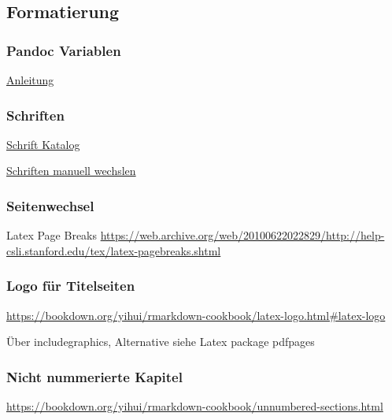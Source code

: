 \documentclass[
  a4paper,
  twoside]{article}
\begin{document}
\newpage

\hypertarget{formatierung}{%
\subsection{Formatierung}\label{formatierung}}

\hypertarget{pandoc-variablen}{%
\subsubsection{Pandoc Variablen}\label{pandoc-variablen}}

\href{https://pandoc.org/MANUAL.html\#variables-for-latex}{Anleitung}

\hypertarget{schriften}{%
\subsubsection{Schriften}\label{schriften}}

\href{https://tug.org/FontCatalogue/}{Schrift Katalog}

\href{https://tex.stackexchange.com/questions/25249/how-do-i-use-a-particular-font-for-a-small-section-of-text-in-my-document}{Schriften manuell wechslen}

\hypertarget{seitenwechsel}{%
\subsubsection{Seitenwechsel}\label{seitenwechsel}}

Latex Page Breaks \url{https://web.archive.org/web/20100622022829/http://help-csli.stanford.edu/tex/latex-pagebreaks.shtml}

\hypertarget{logo-fuxfcr-titelseiten}{%
\subsubsection{Logo für Titelseiten}\label{logo-fuxfcr-titelseiten}}

\url{https://bookdown.org/yihui/rmarkdown-cookbook/latex-logo.html\#latex-logo}

Über includegraphics, Alternative siehe Latex package pdfpages

\hypertarget{nicht-nummerierte-kapitel}{%
\subsubsection{Nicht nummerierte Kapitel}\label{nicht-nummerierte-kapitel}}

\url{https://bookdown.org/yihui/rmarkdown-cookbook/unnumbered-sections.html}
\end{document}
